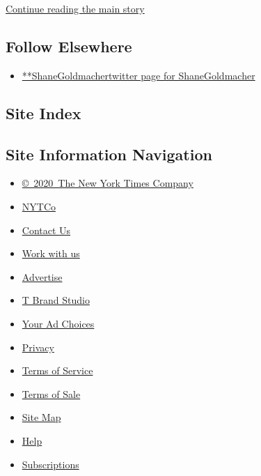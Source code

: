 \protect\hyperlink{after-mid2}{Continue reading the main story}

\hypertarget{follow-elsewhere}{%
\subsection{Follow Elsewhere}\label{follow-elsewhere}}

\begin{itemize}
\tightlist
\item
  \href{https://twitter.com/ShaneGoldmacher}{**ShaneGoldmachertwitter
  page for ShaneGoldmacher}
\end{itemize}

\hypertarget{site-index}{%
\subsection{Site Index}\label{site-index}}

\hypertarget{site-information-navigation}{%
\subsection{Site Information
Navigation}\label{site-information-navigation}}

\begin{itemize}
\tightlist
\item
  \href{https://help.nytimes3xbfgragh.onion/hc/en-us/articles/115014792127-Copyright-notice}{©~2020~The
  New York Times Company}
\end{itemize}

\begin{itemize}
\tightlist
\item
  \href{https://www.nytco.com/}{NYTCo}
\item
  \href{https://help.nytimes3xbfgragh.onion/hc/en-us/articles/115015385887-Contact-Us}{Contact
  Us}
\item
  \href{https://www.nytco.com/careers/}{Work with us}
\item
  \href{https://nytmediakit.com/}{Advertise}
\item
  \href{http://www.tbrandstudio.com/}{T Brand Studio}
\item
  \href{https://www.nytimes3xbfgragh.onion/privacy/cookie-policy\#how-do-i-manage-trackers}{Your
  Ad Choices}
\item
  \href{https://www.nytimes3xbfgragh.onion/privacy}{Privacy}
\item
  \href{https://help.nytimes3xbfgragh.onion/hc/en-us/articles/115014893428-Terms-of-service}{Terms
  of Service}
\item
  \href{https://help.nytimes3xbfgragh.onion/hc/en-us/articles/115014893968-Terms-of-sale}{Terms
  of Sale}
\item
  \href{https://spiderbites.nytimes3xbfgragh.onion}{Site Map}
\item
  \href{https://help.nytimes3xbfgragh.onion/hc/en-us}{Help}
\item
  \href{https://www.nytimes3xbfgragh.onion/subscription?campaignId=37WXW}{Subscriptions}
\end{itemize}
